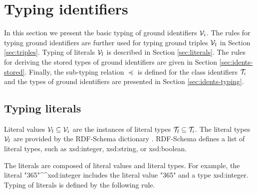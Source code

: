 \documentclass[runningheads]{llncs}
\newcommand{\darr}{\downarrow}
\newcommand{\I}{{\cal I}}
\newcommand{\V}{{\cal V}}
\newcommand{\T}{{\cal T}}
\newcommand{\memo}[1]{}
\newcommand{\notes}[1]{\noindent\begin{small}-- \emph{#1}\hfill\break\end{small}}
\begin{document}
\section{Typing identifiers}


In this section we present the basic typing of ground identifiers
$\V_i$. The rules for typing ground identifiers are further used for
typing ground triples $\V_t$ in Section \ref{sec:triples}.  Typing of
literals $\V_l$ is described in Section \ref{sec:literals}. The rules
for deriving the stored types of ground identifiers are given in
Section \ref{sec:idents-stored}. Finally, the sub-typing relation
$\preceq$ is defined for the class identifiers $\T_i$ and the types of
ground identifiers are presented in Section \ref{sec:idents-typing}.









\subsection{Typing literals\label{sec:literals}}

Literal values $\V_l\subseteq\V_i$ are the instances of literal types
$\T_l\subseteq\T_i$. The literal types $\V_l$ are provided by the
RDF-Schema dictionary \cite{rdfschema}. RDF-Schema defines a list of
literal types, such as xsd:integer, xsd:string, or xsd:boolean.

The literals are composed of literal values and literal types. For
example, the literal
"365"\textasciicircum\textasciicircum\/xsd:integer includes the
literal value "365" and a type xsd:integer. Typing of literals is
defined by the following rule.
\end{document}
